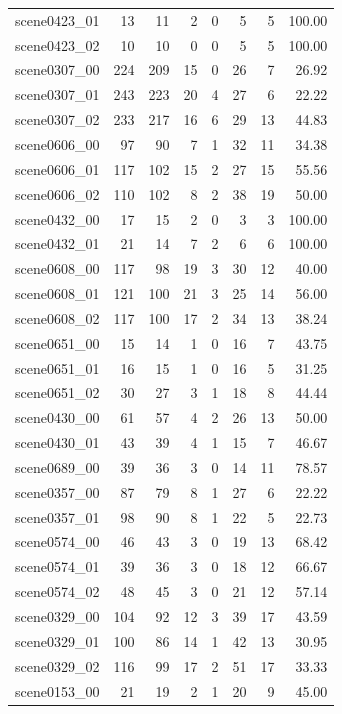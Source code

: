 \begin{table}[t]
\begin{tabular}{lrrrrrrr}
scene0423\_01 & 13 & 11 & 2 & 0 & 5 & 5 & 100.00 \\
scene0423\_02 & 10 & 10 & 0 & 0 & 5 & 5 & 100.00 \\
scene0307\_00 & 224 & 209 & 15 & 0 & 26 & 7 & 26.92 \\
scene0307\_01 & 243 & 223 & 20 & 4 & 27 & 6 & 22.22 \\
scene0307\_02 & 233 & 217 & 16 & 6 & 29 & 13 & 44.83 \\
scene0606\_00 & 97 & 90 & 7 & 1 & 32 & 11 & 34.38 \\
scene0606\_01 & 117 & 102 & 15 & 2 & 27 & 15 & 55.56 \\
scene0606\_02 & 110 & 102 & 8 & 2 & 38 & 19 & 50.00 \\
scene0432\_00 & 17 & 15 & 2 & 0 & 3 & 3 & 100.00 \\
scene0432\_01 & 21 & 14 & 7 & 2 & 6 & 6 & 100.00 \\
scene0608\_00 & 117 & 98 & 19 & 3 & 30 & 12 & 40.00 \\
scene0608\_01 & 121 & 100 & 21 & 3 & 25 & 14 & 56.00 \\
scene0608\_02 & 117 & 100 & 17 & 2 & 34 & 13 & 38.24 \\
scene0651\_00 & 15 & 14 & 1 & 0 & 16 & 7 & 43.75 \\
scene0651\_01 & 16 & 15 & 1 & 0 & 16 & 5 & 31.25 \\
scene0651\_02 & 30 & 27 & 3 & 1 & 18 & 8 & 44.44 \\
scene0430\_00 & 61 & 57 & 4 & 2 & 26 & 13 & 50.00 \\
scene0430\_01 & 43 & 39 & 4 & 1 & 15 & 7 & 46.67 \\
scene0689\_00 & 39 & 36 & 3 & 0 & 14 & 11 & 78.57 \\
scene0357\_00 & 87 & 79 & 8 & 1 & 27 & 6 & 22.22 \\
scene0357\_01 & 98 & 90 & 8 & 1 & 22 & 5 & 22.73 \\
scene0574\_00 & 46 & 43 & 3 & 0 & 19 & 13 & 68.42 \\
scene0574\_01 & 39 & 36 & 3 & 0 & 18 & 12 & 66.67 \\
scene0574\_02 & 48 & 45 & 3 & 0 & 21 & 12 & 57.14 \\
scene0329\_00 & 104 & 92 & 12 & 3 & 39 & 17 & 43.59 \\
scene0329\_01 & 100 & 86 & 14 & 1 & 42 & 13 & 30.95 \\
scene0329\_02 & 116 & 99 & 17 & 2 & 51 & 17 & 33.33 \\
scene0153\_00 & 21 & 19 & 2 & 1 & 20 & 9 & 45.00 \\

\end{tabular}
\end{table}
